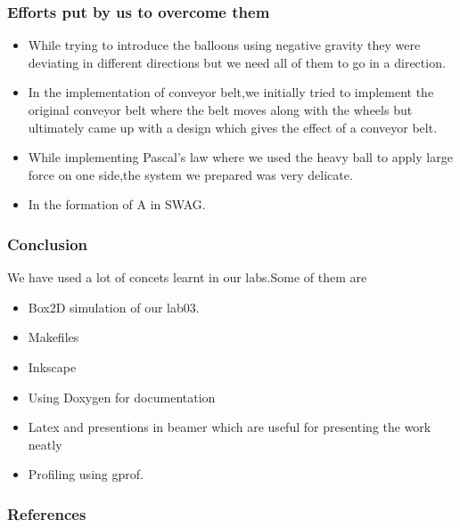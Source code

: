 \documentclass{beamer}
\begin{document}
\begin{frame}
 \frametitle{Efforts put by us to overcome them}
 \begin{itemize}
 \item While trying to introduce the balloons using negative gravity they were deviating in different directions  but we need all of them to go in a direction.
 \item In the implementation of conveyor belt,we initially tried to implement the original conveyor belt where the belt moves along with the wheels but ultimately came up with a design which gives the effect of a conveyor belt.
 \item While implementing Pascal's law where we used the heavy ball to apply large force on one side,the system we prepared was very delicate.
 \item In the formation of A in SWAG.
\end{itemize}
\end{frame}


\begin{frame}
 \frametitle{Conclusion}
 We have used a lot of concets learnt in our labs.Some of them are
 \begin{itemize}
 \item Box2D simulation of our lab03.
 \item Makefiles
 \item Inkscape
 \item Using Doxygen for documentation
 \item Latex and presentions in beamer which are useful for presenting the work neatly
 \item Profiling using gprof.
\end{itemize}
\end{frame}



\begin{frame}
\frametitle{References}
    
    
\end{frame}


 
\end{document}
